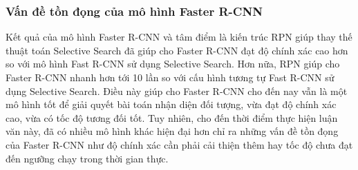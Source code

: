 {    \subsubsection*{Vấn đề tồn đọng của mô hình Faster R-CNN}
    Kết quả của mô hình Faster R-CNN và tâm điểm là kiến trúc RPN giúp thay thế thuật toán Selective Search đã giúp cho Faster R-CNN đạt độ chính xác cao hơn so với mô hình Fast R-CNN sử dụng Selective Search.
    Hơn nữa, RPN giúp cho Faster R-CNN nhanh hơn tới 10 lần so với cấu hình tương tự Fast R-CNN sử dụng Selective Search.
    Điều này giúp cho Faster R-CNN cho đến nay vẫn là một mô hình tốt để giải quyết bài toán nhận diện đối tượng, vừa đạt độ chính xác cao, vừa có tốc độ tương đối tốt.
    Tuy nhiên, cho đến thời điểm thực hiện luận văn này, đã có nhiều mô hình khác hiện đại hơn chỉ ra những vấn đề tồn đọng của Faster R-CNN như độ chính xác cần phải cải thiện thêm hay tốc độ chưa đạt đến ngưỡng chạy trong thời gian thực. 
}